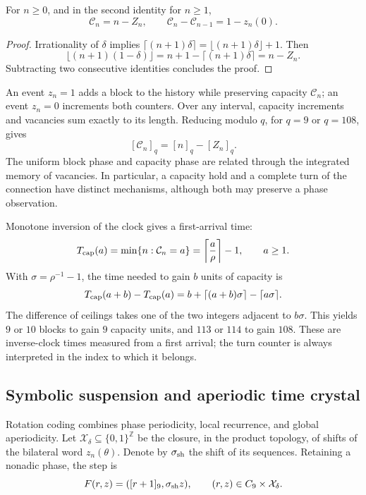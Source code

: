 \begin{proposition}
\label{mono-ampl:balance-capacidad}
For \(n\geq0\), and in the second identity for \(n\geq1\),
\[
 \mathcal C_n=n-Z_n,\qquad
 \mathcal C_n-\mathcal C_{n-1}=1-z_n(0).
\]
\end{proposition}
\begin{proof}
Irrationality of \(\delta\) implies
\(\lceil(n+1)\delta\rceil=\lfloor(n+1)\delta\rfloor+1\).
Then
\[
 \lfloor(n+1)(1-\delta)\rfloor
 =n+1-\lceil(n+1)\delta\rceil=n-Z_n.
\]
Subtracting two consecutive identities concludes the proof.
\end{proof}

An event \(z_n=1\) adds a block to the history while preserving capacity
\(\mathcal C_n\); an event \(z_n=0\) increments both counters. Over
any interval, capacity increments and vacancies sum
exactly to its length. Reducing modulo \(q\), for \(q=9\) or
\(q=108\), gives
\[
 [\mathcal C_n]_q=[n]_q-[Z_n]_q.
\]
The uniform block phase and capacity phase are related through
the integrated memory of vacancies. In particular, a capacity
hold and a complete turn of the connection have distinct
mechanisms, although both may preserve a phase observation.

Monotone inversion of the clock gives a first-arrival time:
\[
 T_{\rm cap}(a)=\min\{n:\mathcal C_n=a\}
 =\left\lceil\frac a\rho\right\rceil-1,
 \qquad a\geq1.
\]
With \(\sigma=\rho^{-1}-1\), the time needed to gain \(b\) units
of capacity is
\[
 T_{\rm cap}(a+b)-T_{\rm cap}(a)
 =b+\lceil(a+b)\sigma\rceil-\lceil a\sigma\rceil.
\]
The difference of ceilings takes one of the two integers adjacent to
\(b\sigma\). This yields \(9\) or \(10\) blocks to gain
\(9\) capacity units, and \(113\) or \(114\) to gain \(108\).
These are inverse-clock times measured from a first arrival; the
turn counter is always interpreted in the index to which it belongs.

\subsection{Symbolic suspension and aperiodic time crystal}
\label{mono-ampl:cristal}

Rotation coding combines phase periodicity, local recurrence,
and global aperiodicity. Let \(\mathcal X_\delta\subseteq\{0,1\}^{\mathbb Z}\)
be the closure, in the product topology, of shifts of the bilateral
word \(z_n(\theta)\). Denote by \(\sigma_{\rm sh}\) the
shift of its sequences. Retaining a nonadic phase, the step is
\[
 F(r,z)=([r+1]_9,\sigma_{\rm sh}z),\qquad
 (r,z)\in C_9\times\mathcal X_\delta.
\]


